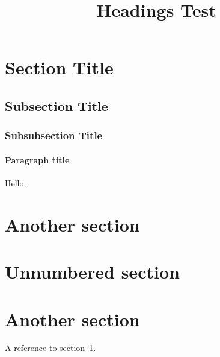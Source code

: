 
  \title{Headings Test}
  \maketitle

  \section{Section Title} \label{first-section}

  \subsection{Subsection Title}

  \subsubsection{Subsubsection Title}

  \paragraph{Paragraph title}

  Hello.

  \section{Another section}

  \section*{Unnumbered section}

  \section{Another section}

  A reference to section~\ref{first-section}.


